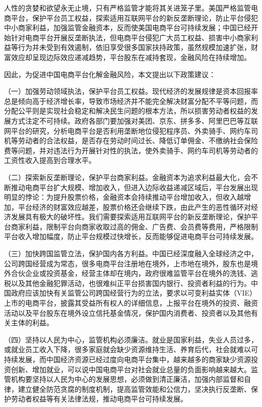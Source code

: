\documentclass[12pt,twoside,utf8]{ctexart}
\begin{document}
人性的贪婪和欲望永无止境，只有严格监管才能将其关进笼子里。美国严格监管电商平台，保护平台员工权益，探索适用互联网平台的新反垄断理论，防止平台侵犯中小商家利益，加强监管金融资本，反而使美国电商平台可持续发展；中国已经开始针对电商平台开展反垄断执法，但电商平台侵犯广大员工权益、损害中小商家利益等行为并未受到有效遏制，依旧享受很多国家扶持政策，虽然规模加速扩张，财富效应却呈现边际效应递减趋势，平台股东在减持套现，金融风险在持续增加。

因此，为促进中国电商平台化解金融风险，本文提出以下政策建议：

（一）加强劳动领域执法，保护平台员工权益。现代经济的发展规律是资本回报率总是倾向高于经济增长率，导致市场经济并不能完全解决财富分配不平等问题，而分配公平则是实现社会稳定和解决民生问题的根本方法，所以损害劳动者权益的发展方式注定不可持续。政府各部门要加强对美团、京东、拼多多、阿里巴巴等互联网平台的研究，分析电商平台是否利用垄断地位侵犯程序员、外卖骑手、网约车司机等劳动者的合法权益，是否存在劳动时间过长、降低订单佣金、不缴纳社会保险费等问题，并对违法行为开展针对性的执法，使外卖骑手、网约车司机等劳动者的工资性收入提高到合理水平。

（二）探索新反垄断理论，保护平台商家利益。金融资本为追求利益最大化，会不断推动电商平台扩大规模、增加收入，但进入边际收益递减区域后，平台发展出现明显的悖论：为提升股票价格，金融资本会持续推动平台增加收入，但收入越增加，平台经济的财富效应越差，股票价格还会继续下跌，由此产生的恶性循环对经济发展具有极大的破坏性。我们需要探索适用互联网平台的新反垄断理论，保护平台商家利益，限制平台向商家收取过高的佣金、广告费、会员费等费用，严格限制平台收入增加幅度，防止平台规模过快增长，反而能够促进电商平台可持续发展。

（三）加快跨国监管立法，保护国内各方利益。中国已经深度融入全球经济之中，公司跨国经营成为常态，很多电商平台注册地在境外，上市地在境外，股东也是境外合伙企业或投资基金，经营主体却在境内，政府很难监管平台在境外的洗钱、逃税以及其他金融犯罪活动，也很难纠正平台损害国内银行、投资者利益的行为。中国政府应该加快有关监管公司跨国经营行为的立法，要求以可变利益实体（VIE）上市的电商平台，披露其受益所有权人的详细信息，上报平台在境外的投资、融资活动以及平台股东在境外设立信托基金情况，保护国内消费者、投资者以及其他有关主体的利益。

（四）坚持以人民为中心，监管机构必须廉洁。就业是国家利益，失业人员过多，或就业员工收入下降，很多家庭就会缺少资源维持生活、养育后代，社会就难以可持续发展，而中国经济资源已经过度向电商平台集中，越来越多的商家缺少资源投资创新、增加就业，可以说中国电商平台对社会就业总量的负面影响越来越大。监管机构要坚持以人民为中心的发展思想，必须做到清正廉洁，加强内部监督和自律，建立健全防范贪腐的制度机制，提高监管效能和公信力，坚决执行反垄断、保护劳动者权益等有关法律法规，推动电商平台可持续发展。
\end{document}
